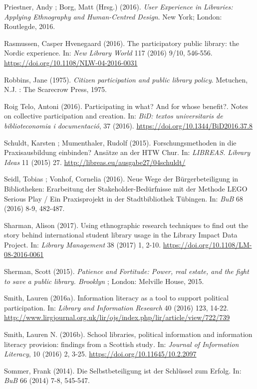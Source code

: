 \documentclass[a4paper,
fontsize=11pt,
oneside,
numbers=noperiodatend,
parskip=half-,
bibliography=totoc,
final
]{scrartcl}
\begin{document}
Priestner, Andy ; Borg, Matt (Hrsg.) (2016). \emph{User Experience in
Libraries: Applying Ethnography and Human-Centred Design}. New York;
London: Routlegde, 2016.

Rasmussen, Casper Hvenegaard (2016). The participatory public library:
the Nordic experience. In: \emph{New Library World} 117 (2016) 9/10,
546-556. \url{https://doi.org/10.1108/NLW-04-2016-0031}

Robbins, Jane (1975). \emph{Citizen participation and public library
policy}. Metuchen, N.J. : The Scarecrow Press, 1975.

Roig Telo, Antoni (2016). Participating in what? And for whose benefit?.
Notes on collective participation and creation. In: \emph{BiD: textos
universitaris de biblioteconomia i documentació}, 37 (2016).
\href{http://dx.doi.org/10.1344/BiD2016.37.8}{https://doi.org/10.1344/BiD2016.37.8}

Schuldt, Karsten ; Mumenthaler, Rudolf (2015). Forschungsmethoden in die
Praxisausbildung einbinden? Ansätze an der HTW Chur. In: \emph{LIBREAS.
Library Ideas} 11 (2015) 27.
\url{http://libreas.eu/ausgabe27/04schuldt/}

Seidl, Tobias ; Vonhof, Cornelia (2016). Neue Wege der Bürgerbeteiligung
in Bibliotheken: Erarbeitung der Stakeholder-Bedürfnisse mit der Methode
LEGO Serious Play / Ein Praxisprojekt in der Stadtbibliothek Tübingen.
In: \emph{BuB} 68 (2016) 8-9, 482-487.

Sharman, Alison (2017). Using ethnographic research techniques to find
out the story behind international student library usage in the Library
Impact Data Project. In: \emph{Library Management} 38 (2017) 1, 2-10.
\url{https://doi.org/10.1108/LM-08-2016-0061}

Sherman, Scott (2015). \emph{Patience and Fortitude: Power, real estate,
and the fight to save a public library. Brooklyn} ; London: Melville
House, 2015.

Smith, Lauren (2016a). Information literacy as a tool to support
political participation. In: \emph{Library and Information Research} 40
(2016) 123, 14-22.
\url{http://www.lirgjournal.org.uk/lir/ojs/index.php/lir/article/view/722/739}

Smith, Lauren N. (2016b). School libraries, political information and
information literacy provision: findings from a Scottish study\emph{.}
In: \emph{Journal of Information Literacy}, 10 (2016) 2, 3-25.
\href{http://dx.doi.org/10.11645/10.2.2097}{https://doi.org/10.11645/10.2.2097}

Sommer, Frank (2014). Die Selbstbeteiligung ist der Schlüssel zum
Erfolg. In: \emph{BuB} 66 (2014) 7-8, 545-547.
\end{document}
